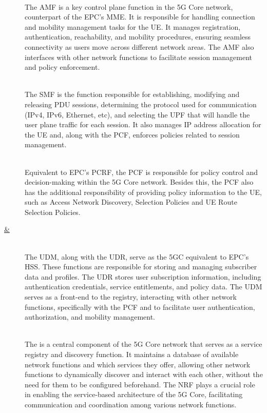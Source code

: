 \begin{description}
  \item[\normalfont\uline{}]~\\
  The \gls{AMF} is a key control plane function in the 5G Core network, counterpart of the \gls{EPC}'s  \gls{MME}. It is responsible for handling connection and mobility management tasks for the \gls{UE}. It manages registration, authentication, reachability, and mobility procedures, ensuring seamless connectivity as users move across different network areas. The AMF also interfaces with other network functions to facilitate session management and policy enforcement.
  
  \item[\normalfont\uline{}]~\\
  The \gls{SMF} is the function responsible for establishing, modifying and releasing \gls{PDU} sessions, determining the protocol used for communication (IPv4, IPv6, Ethernet, etc), and selecting the \gls{UPF} that will handle the user plane traffic for each session. It also manages IP address allocation for the \gls{UE} and, along with the \gls{PCF}, enforces policies related to session management.

  \item[\normalfont\uline{}]~\\ 
  Equivalent to \gls{EPC}'s \gls{PCRF}, the \gls{PCF} is responsible for policy control and decision-making within the 5G Core network. Besides this, the \gls{PCF} also has the additional responsibility of providing policy information to the \gls{UE}, such as Access Network Discovery, Selection Policies and UE Route Selection Policies.

  \item[\normalfont\uline{ \& }]~\\
  The \gls{UDM}, along with the \gls{UDR}, serve as the 5GC equivalent to \gls{EPC}'s \gls{HSS}. These functions are responsible for storing and managing subscriber data and profiles. The \gls{UDR} stores user subscription information, including authentication credentials, service entitlements, and policy data. The \gls{UDM} serves as a front-end to the registry, interacting with other network functions, specifically with the \gls{PCF} and  to facilitate user authentication, authorization, and mobility management.

  \item[\normalfont\uline{}]~\\ 
  The  is a central component of the 5G Core network that serves as a service registry and discovery function. It maintains a database of available network functions and which services they offer, allowing other network functions to dynamically discover and interact with each other, without the need for them to be configured beforehand. The NRF plays a crucial role in enabling the service-based architecture of the 5G Core, facilitating communication and coordination among various network functions.


\end{description}
